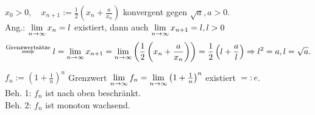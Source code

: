 \documentclass[../ana1.tex]{subfiles}
\begin{document}
\begin{bsp}[1]
	\(x_0 > 0, \quad x_{n+1} := \frac{1}{2} \left( x_n + \frac{a}{x_n} \right) \) konvergent gegen \(\sqrt{a}, a>0 \).\\
	Ang.: \( \lim\limits_{n\rightarrow\infty} x_n = l \) existiert, dann auch \( \lim\limits_{n\rightarrow\infty} x_{n+1} = l, l>0 \)
	\[ \overset{\text{Grenzwertsätze}}{\Longrightarrow} l = \lim\limits_{n\rightarrow\infty} x_{n+1} = \lim\limits_{n\rightarrow\infty} \left( \frac{1}{2} \left(x_n + \frac{a}{x_n} \right) \right) = \frac{1}{2} \left( l + \frac{a}{l} \right) \Rightarrow l^2 = a, l = \sqrt{a}. \]
\end{bsp}
\begin{bsp}[2]
	\(f_n := {\left( 1 + \frac{1}{n} \right)}^n \) Grenzwert \( \lim\limits_{n\rightarrow\infty} f_n = \lim\limits_{n\rightarrow\infty} {\left( 1 + \frac{1}{n} \right)}^n \) existiert \( =: e \).\\
	Beh. 1: \( f_n\) ist nach oben beschränkt.\\
	Beh. 2: \( f_n\) ist monoton wachsend.
\end{bsp}
\end{document}
